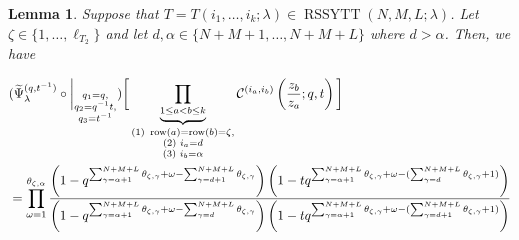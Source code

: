 \documentclass[12pt,reqno,a4paper]{amsart}
\newcommand{\comp}{\circ}
\newcommand{\cals}[1]{\mathcal{#1}}
\numberwithin{equation}{section}
\newtheorem{lem}[thm]{Lemma}
\theoremstyle{definition}
\begin{document}
\begin{lem}
Suppose that $T = T(i_1,\dots,i_k;\lambda) \in \operatorname{RSSYTT}(N,M,L;\lambda)$. Let $\zeta \in \{1,\dots,\ell_{T_2}\}$ and let $d, \alpha \in \{N+M+1,\dots,N+M+L\}$ where $d > \alpha$. Then, we have 

\footnotesize
\begin{align}
	&(
	\widetilde{\Psi}_{\lambda}^{(q,t^{-1})}
	\comp 
	\bigg|_{
		\substack{
			q_1 = q, \\
			q_2 = q^{-1}t,\\
			q_3 = t^{-1} \\
		}
	}
	)
	\bigg[
	\underbrace{	\prod_{1 \leq a < b \leq k}				}_{
		\substack{
			(1) \,\, \operatorname{row}(a) = \operatorname{row}(b) = \zeta, 
			\\
			(2) \,\, i_a =  d
			\\
			(3) \,\, i_b = \alpha
		}	
	}
	\cals{C}^{(i_a,i_b)}\left(
	\frac{z_b}{z_a}
	; q, t
	\right)
	\bigg]
	\\
	&= 
	\prod_{\omega = 1}^{\theta_{\zeta,\alpha}}
	\frac{
		\left(	1 - q^{	\sum_{\gamma = \alpha + 1}^{N + M + L} \theta_{\zeta,\gamma}	+ \omega - \sum_{\gamma = d+1}^{N + M + L}\theta_{\zeta,\gamma} 		}			\right)
		\left(	1 - tq^{	\sum_{\gamma = \alpha + 1}^{N + M + L} \theta_{\zeta,\gamma}	+ \omega - (\sum_{\gamma = d}^{N + M + L}\theta_{\zeta,\gamma} 	+ 1 )	}		\right)
	}{
		\left(	1 - q^{	\sum_{\gamma = \alpha + 1}^{N + M + L} \theta_{\zeta,\gamma}	+ \omega - \sum_{\gamma = d}^{N + M + L}\theta_{\zeta,\gamma} 		}			\right)
		\left(	1 - 	tq^{	\sum_{\gamma = \alpha + 1}^{N + M + L} \theta_{\zeta,\gamma}	+ \omega - (\sum_{\gamma = d + 1}^{N + M + L}\theta_{\zeta,\gamma} 	+ 1 )	}			\right)
	}
	\notag 
\end{align}
\normalsize
\end{lem}
\end{document}
